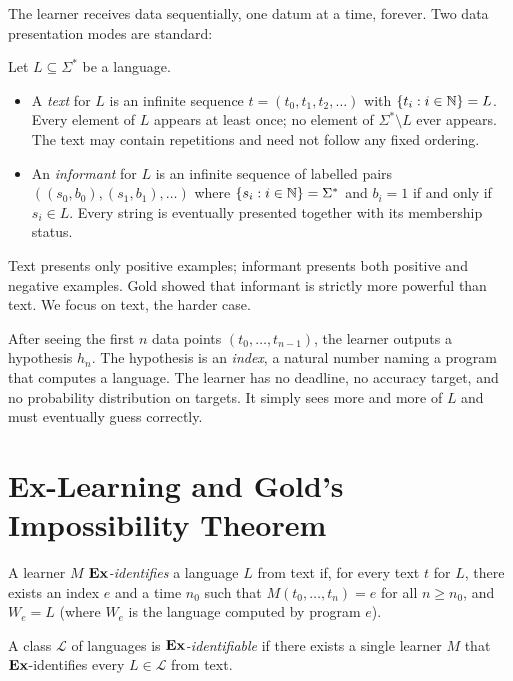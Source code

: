 The learner receives data sequentially, one datum at a time, forever. Two data presentation modes are standard:

\begin{defn}
\label{def:text-informant}
Let $L \subseteq \Sigma^*$ be a language.
\begin{itemize}[leftmargin=*,itemsep=2pt]
\item A \emph{text} for $L$ is an infinite sequence $t = (t_0, t_1, t_2, \ldots)$ with $\{t_i : i \in \mathbb{N}\} = L$. Every element of $L$ appears at least once; no element of $\Sigma^* \setminus L$ ever appears. The text may contain repetitions and need not follow any fixed ordering.
\item An \emph{informant} for $L$ is an infinite sequence of labelled pairs $((s_0, b_0), (s_1, b_1), \ldots)$ where $\{s_i : i \in \mathbb{N}\} = \Sigma^*$ and $b_i = 1$ if and only if $s_i \in L$. Every string is eventually presented together with its membership status.
\end{itemize}
\end{defn}

Text presents only positive examples; informant presents both positive and negative examples. Gold showed that informant is strictly more powerful than text. We focus on text, the harder case.

After seeing the first $n$ data points $(t_0, \ldots, t_{n-1})$, the learner outputs a hypothesis $h_n$. The hypothesis is an \emph{index}, a natural number naming a program that computes a language. The learner has no deadline, no accuracy target, and no probability distribution on targets. It simply sees more and more of $L$ and must eventually guess correctly.


\section{Ex-Learning and Gold's Impossibility Theorem}
\label{sec:ex-gold}

\begin{defn}
\label{def:ex-learning}
A learner $M$ \emph{$\mathbf{Ex}$-identifies} a language $L$ from text if, for every text $t$ for $L$, there exists an index $e$ and a time $n_0$ such that $M(t_0, \ldots, t_n) = e$ for all $n \geq n_0$, and $W_e = L$ (where $W_e$ is the language computed by program $e$).

A class $\mathcal{L}$ of languages is \emph{$\mathbf{Ex}$-identifiable} if there exists a single learner $M$ that $\mathbf{Ex}$-identifies every $L \in \mathcal{L}$ from text.
\end{defn}

